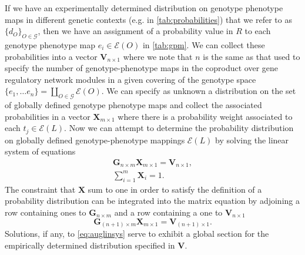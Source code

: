 If we have an experimentally determined distribution on genotype phenotype maps in different genetic contexts (e.g. in \ref{tab:probabilities}) that we refer to as $\{d_O\}_{O \in \mathcal{G}}$, then we have an assignment of a probability value in $R$ to each genotype phenotype map $e_i \in \mathcal{E}(O)$ in \ref{tab:gpm}. We can collect these probabilities into a vector $\mathbf{V}_{n \times 1}$ where we note that $n$ is the same as that used to specify the number of genotype-phenotype maps in the coproduct over gene regulatory network modules in a given covering of the genotype space $\{e_1, \ldots e_n\} = \coprod_{O \in \mathcal{G}} \mathcal{E}(O)$. We can specify as unknown a distribution on the set of globally defined genotype phenotype maps and collect the associated probabilities in a vector $\mathbf{X}_{m \times 1}$ where there is a probability weight associated to each $t_j \in \mathcal{E}(L)$. Now we can attempt to determine the probability distribution on globally defined genotype-phenotype mappings $\mathcal{E}(L)$ by solving the linear system of equations
\begin{equation}
\begin{split}
\mathbf{G}_{n \times m} \mathbf{X}_{m \times 1} = \mathbf{V}_{n \times 1},\\
\sum_{i=1}^{m} \mathbf{X}_{i} = 1.
\end{split}
\end{equation}
The constraint that $\mathbf{X}$ sum to one in order to satisfy the definition of a probability distribution can be integrated into the matrix equation by adjoining a row containing ones to $\mathbf{G}_{n \times m}$ and a row containing a one to $\mathbf{V}_{n \times 1}$
\begin{equation}\label{eq:auglinsys}
\mathbf{G}_{(n + 1) \times m} \mathbf{X}_{m \times 1} = \mathbf{V}_{(n + 1) \times 1}.
\end{equation}
Solutions, if any, to \ref{eq:auglinsys} serve to exhibit a global section for the empirically determined distribution specified in $\mathbf{V}$.

